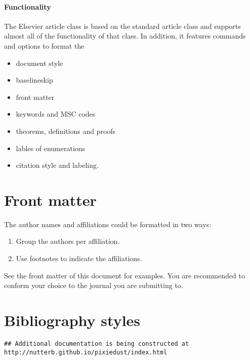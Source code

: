 \documentclass[]{elsarticle} %
\begin{document}
\paragraph{Functionality}\label{functionality}

The Elsevier article class is based on the standard article class and
supports almost all of the functionality of that class. In addition, it
features commands and options to format the

\begin{itemize}
\item
  document style
\item
  baselineskip
\item
  front matter
\item
  keywords and MSC codes
\item
  theorems, definitions and proofs
\item
  lables of enumerations
\item
  citation style and labeling.
\end{itemize}

\section{Front matter}\label{front-matter}

The author names and affiliations could be formatted in two ways:

\begin{enumerate}
\def\labelenumi{(\arabic{enumi})}
\item
  Group the authors per affiliation.
\item
  Use footnotes to indicate the affiliations.
\end{enumerate}

See the front matter of this document for examples. You are recommended
to conform your choice to the journal you are submitting to.

\section{Bibliography styles}\label{bibliography-styles}

\begin{verbatim}
## Additional documentation is being constructed at http://nutterb.github.io/pixiedust/index.html
\end{verbatim}

\setlength{\tabcolsep}{6pt}
\end{document}
